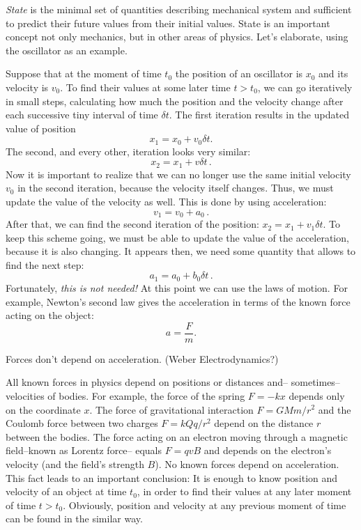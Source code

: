 \emph{State} is the minimal set of quantities describing mechanical
system and sufficient to predict
their future values from their initial values. State is an important
concept not only mechanics, but in other areas of physics.
Let's elaborate, using the oscillator as an example.

Suppose that at the moment of time $t_{0}$ the position of an oscillator
is $x_{0}$ and its velocity is $v_{0}$. To find their values at
some later time $t>t_{0}$, we can go iteratively in small steps, calculating
how much the position and the velocity change after each successive
tiny interval of time $\delta t$. The first iteration results in
the updated value of position
\[
	x_{1}=x_{0}+v_{0}\delta t.
\]
The second, and every other, iteration looks very similar:
\[
	x_{2}=x_{1}+v\delta t\,.
\]
Now it is important to realize that we can no longer use the same initial
velocity $v_{0}$ in the second iteration, because the velocity itself
changes. Thus, we must update the value of the velocity as well. This
is done by using acceleration:
\[
	v_{1}=v_{0}+a_{0}\,.
\]
After that, we can find the second iteration of the position:
$x_{2}=x_{1}+v_{1}\delta t$. To keep this scheme going, we must be
able to update the value of the acceleration, because it is also changing.
It appears then, we need some quantity that allows to find the next
step:
\[
	a_{1}=a_{0}+b_{0}\delta t\,.
\]
Fortunately, \emph{this is not needed!} At this point we can use the laws of motion.
For example, Newton's second law gives the acceleration in terms of the known force acting on the object:
\begin{equation}
	a=\frac{F}{m}.
\end{equation}
\begin{important}
	Forces don't depend on acceleration. (Weber Electrodynamics?)
\end{important}

All known forces in physics depend on positions or distances and--
sometimes-- velocities of bodies. For example, the force of the spring $F=-kx$
depends only on the coordinate $x$. The force of gravitational interaction $F=GMm/r^2$
and the Coulomb force between two charges $F=kQq/r^2$ depend on the distance
$r$ between the bodies. The force acting on an electron moving through
a magnetic field--known as Lorentz force-- equals $F=qvB$ and 
depends on the electron's velocity (and the field's strength $B$). 
No known forces depend on acceleration. This fact leads to an important conclusion:
It is enough to know position and velocity of an object at time $t_{0}$,
in order to find their values at any later moment of time $t>t_{0}$.
Obviously, position and velocity at any previous moment of time can
be found in the similar way.

